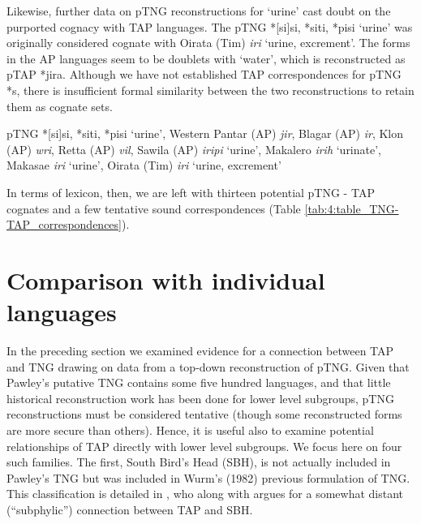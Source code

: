 Likewise, further data on pTNG reconstructions for `urine' cast doubt on the purported cognacy with TAP languages. The pTNG *[si]si, *siti, *pisi `urine' was originally considered cognate with Oirata (Tim) \textit{iri} `urine, excrement'. The forms in the AP languages seem to be doublets with `water', which is reconstructed as pTAP *jira. Although we have not established TAP correspondences for pTNG *s, there is insufficient formal similarity between the two reconstructions to retain them as cognate sets.

\ea%
   pTNG *[si]si, *siti, *pisi `urine', Western Pantar (AP) \textit{jir}, Blagar (AP) \textit{ir}, Klon (AP) \textit{wri}, Retta (AP) \textit{vil}, Sawila (AP) \textit{iripi{\ng}} `urine', Makalero \textit{irih }`urinate', Makasae \textit{iri }`urine', Oirata (Tim) \textit{iri} `urine, excrement'  
\z

In terms of lexicon, then, we are left with thirteen potential pTNG - TAP cognates and a few tentative sound correspondences (Table \ref{tab:4:table_TNG-TAP_correspondences}).

\section{Comparison with individual languages} \label{sec:4:5}
In the preceding section we examined evidence for a connection between TAP and TNG drawing on data from a top-down reconstruction of pTNG. Given that Pawley's putative TNG contains some five hundred languages, and that little historical reconstruction work has been done for lower level subgroups, pTNG reconstructions must be considered tentative (though some reconstructed forms are more secure than others). Hence, it is useful also to examine potential relationships of TAP directly with lower level subgroups. We focus here on four such families. The first, South Bird's Head (SBH), is not actually included in Pawley's TNG but was included in Wurm's (1982) previous formulation of TNG. This classification is detailed in \citet{Voorhoeve1975}, who along with \citet{Stokhof1975} argues for a somewhat distant (``subphylic'') connection between TAP and SBH. \nocite{Wurm1982}


